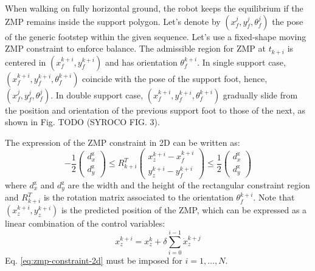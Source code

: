 When walking on fully horizontal ground, the robot keeps the equilibrium 
if the ZMP remains inside the support polygon. Let's denote by
$(x_f^j, y_f^j, \theta_f^j)$ the pose of the 
generic footstep within the given sequence.
Let's use a fixed-shape moving ZMP constraint \cite{aboudonia17} to
enforce balance. The admissible region for ZMP at $t_{k+i}$ is centered in 
$(x_f^{k+i}, y_f^{k+i})$ and has orientation $\theta_f^{k+i}$.
In single support case, $(x_f^{k+i}, y_f^{k+i}, \theta_f^{k+i})$ coincide with
the pose of the support foot, hence, $(x_f^j, y_f^j, \theta_f^j)$.
In double support case, $(x_f^{k+i}, y_f^{k+i}, \theta_f^{k+i})$ gradually
slide from the position 
and orientation of the previous support foot to those of the next, as shown 
in Fig. TODO (SYROCO FIG. 3). 

The expression of the ZMP constraint in 2D can be written as:
\begin{equation}
  \label{eq:zmp-constraint-2d}
  -\frac{1}{2}
  \begin{pmatrix}
    d_x^\text{z} \\
    d_y^\text{z}
  \end{pmatrix}
  \le
  R_{k+i}^T
  \begin{pmatrix}
    x_z^{k+i} - x_f^{k+i} \\
    y_z^{k+i} - y_f^{k+i}
  \end{pmatrix}
  \le
  \frac{1}{2}
  \begin{pmatrix}
    d_x^\text{z} \\
    d_y^\text{z}
  \end{pmatrix}
\end{equation}
where $d_x^\text{z}$ and $d_y^\text{z}$ are the width and the height of the
rectangular constraint region and $R_{k+i}^T$ is the rotation matrix associated
to the orientation $\theta_f^{k+i}$.
Note that $(x_z^{k+i}, y_z^{k+i})$ is the predicted position
of the ZMP, which can be expressed as a linear combination of the control
variables:
\begin{equation}
  \label{eq:piecewise-linear-zmp-trajectory}
  x_z^{k+i} = x_z^k + \delta \sum_{i=0}^{i-1} \dot{x}_z^{k+j}
\end{equation}
Eq. \eqref{eq:zmp-constraint-2d} must be imposed for $i = 1, \dots, N$.

